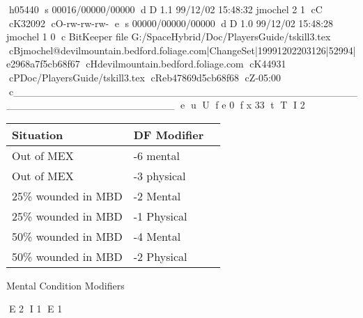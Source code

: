 h05440
s 00016/00000/00000
d D 1.1 99/12/02 15:48:32 jmochel 2 1
cC
cK32092
cO-rw-rw-rw-
e
s 00000/00000/00000
d D 1.0 99/12/02 15:48:28 jmochel 1 0
c BitKeeper file G:/SpaceHybrid/Doc/PlayersGuide/tskill3.tex
cBjmochel@devilmountain.bedford.foliage.com|ChangeSet|19991202203126|52994|e2968a7f5cb68f67
cHdevilmountain.bedford.foliage.com
cK44931
cPDoc/PlayersGuide/tskill3.tex
cReb47869d5cb68f68
cZ-05:00
c______________________________________________________________________
e
u
U
f e 0
f x 33
t
T
I 2
\begin{SHTable}[h]
	\begin{tabular}{lll}
	Situation			& DF Modifier	\\
	\hline
	Out of MEX 			& -6 mental 	\\
	Out of MEX			& -3 physical	\\
	25\% wounded in MBD & -2 Mental		\\
	25\% wounded in MBD	& -1 Physical 	\\
	50\% wounded in MBD & -4 Mental		\\
	50\% wounded in MBD & -2 Physical	\\

    \end{tabular}
    \caption{Mental Condition Modifiers}
\end{SHTable}
E 2
I 1
E 1
